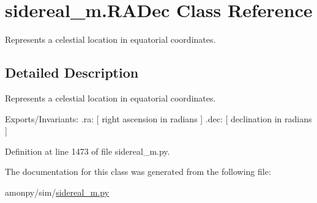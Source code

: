 \hypertarget{classsidereal__m_1_1_r_a_dec}{\section{sidereal\-\_\-m.\-R\-A\-Dec Class Reference}
\label{classsidereal__m_1_1_r_a_dec}
}


Represents a celestial location in equatorial coordinates.  




\subsection{Detailed Description}
Represents a celestial location in equatorial coordinates. 

Exports/\-Invariants\-: .ra\-: \mbox{[} right ascension in radians \mbox{]} .dec\-: \mbox{[} declination in radians \mbox{]} 

Definition at line 1473 of file sidereal\-\_\-m.\-py.



The documentation for this class was generated from the following file\-:\begin{DoxyCompactItemize}
\item 
amonpy/sim/\hyperlink{sidereal__m_8py}{sidereal\-\_\-m.\-py}\end{DoxyCompactItemize}
